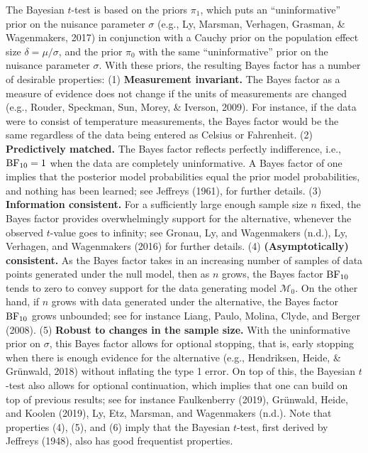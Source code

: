 \documentclass[english,,doc,floatsintext]{apa6}
\begin{document}
The Bayesian \(t\)-test is based on the priors \(\pi_{1}\), which puts an ``uninformative'' prior on the nuisance parameter \(\sigma\) (e.g., Ly, Marsman, Verhagen, Grasman, \& Wagenmakers, 2017) in conjunction with a Cauchy prior on the population effect size \(\delta = \mu / \sigma\), and the prior \(\pi_{0}\) with the same ``uninformative'' prior on the nuisance parameter \(\sigma\). With these priors, the resulting Bayes factor has a number of desirable properties: (1) \textbf{Measurement invariant.} The Bayes factor as a measure of evidence does not change if the units of measurements are changed (e.g., Rouder, Speckman, Sun, Morey, \& Iverson, 2009). For instance, if the data were to consist of temperature measurements, the Bayes factor would be the same regardless of the data being entered as Celsius or Fahrenheit. (2) \textbf{Predictively matched.} The Bayes factor reflects perfectly indifference, i.e., \(\textnormal{BF}_{10}=1\) when the data are completely uninformative. A Bayes factor of one implies that the posterior model probabilities equal the prior model probabilities, and nothing has been learned; see Jeffreys (1961), for further details. (3) \textbf{Information consistent.} For a sufficiently large enough sample size \(n\) fixed, the Bayes factor provides overwhelmingly support for the alternative, whenever the observed \(t\)-value goes to infinity; see Gronau, Ly, and Wagenmakers (n.d.), Ly, Verhagen, and Wagenmakers (2016) for further details. (4) \textbf{(Asymptotically) consistent.} As the Bayes factor takes in an increasing number of samples of data points generated under the null model, then as \(n\) grows, the Bayes factor \(\textnormal{BF}_{10}\) tends to zero to convey support for the data generating model \(\mathcal{M}_{0}\). On the other hand, if \(n\) grows with data generated under the alternative, the Bayes factor \(\textnormal{BF}_{10}\) grows unbounded; see for instance Liang, Paulo, Molina, Clyde, and Berger (2008). (5) \textbf{Robust to changes in the sample size.} With the uninformative prior on \(\sigma\), this Bayes factor allows for optional stopping, that is, early stopping when there is enough evidence for the alternative (e.g., Hendriksen, Heide, \& Grünwald, 2018) without inflating the type 1 error. On top of this, the Bayesian \(t\)-test also allows for optional continuation, which implies that one can build on top of previous results; see for instance Faulkenberry (2019), Grünwald, Heide, and Koolen (2019), Ly, Etz, Marsman, and Wagenmakers (n.d.). Note that properties (4), (5), and (6) imply that the Bayesian \(t\)-test, first derived by Jeffreys (1948), also has good frequentist properties.
\end{document}
